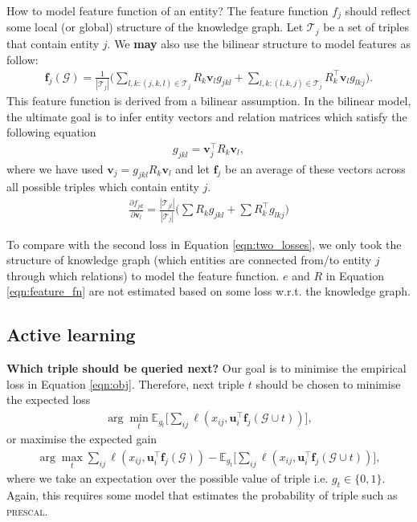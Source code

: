\documentclass{article} %
\theoremstyle{definition}
\newcommand\bs{\boldsymbol}
\begin{document}
How to model feature function of an entity? The feature function $f_j$ should reflect some local (or global) structure of the knowledge graph.  Let $\mathcal{T}_j$ be a set of triples that contain entity $j$. We \textbf{may} also use the bilinear structure to model features as follow:
\begin{align}
\label{eqn:feature_fn}
\bs{f}_j(\mathcal{G}) = \frac{1}{|\mathcal{T}_j|} \bigg( \sum_{l,k:(j,k,l) \in \mathcal{T}_j} R_k \bs{v}_{l} g_{jkl} + \sum_{l,k:(l,k,j) \in \mathcal{T}_j}R_k^\top \bs{v}_{l} g_{lkj} \bigg).
\end{align}
This feature function is derived from a bilinear assumption. In the bilinear model, the ultimate goal is to infer entity vectors and relation matrices which satisfy the following equation
\begin{align}
g_{jkl} = \bs{v}_j ^\top R_k \bs{v}_l,
\end{align}
where we have used $\bs{v}_j = g_{jkl} R_k \bs{v}_l$ and let $\bs{f}_j$ be an average of these vectors across all possible triples which contain entity $j$.
\begin{align}
\frac{\partial f_{jd}}{\partial\bs{v}_l} = \frac{|\mathcal{T}_{jl}|}{|\mathcal{T}_j|} \bigg( \sum R_k g_{jkl} + \sum R_k^\top g_{lkj} \bigg)
\end{align}

To compare with the second loss in Equation \ref{eqn:two_losses}, we only took the structure of knowledge graph (which entities are connected from/to entity $j$ through which relations) to model the feature function. $e$ and $R$ in Equation \ref{eqn:feature_fn} are not estimated based on some loss w.r.t. the knowledge graph.

\subsection{Active learning}
\textbf{Which triple should be queried next?} Our goal is to minimise the empirical loss in Equation \ref{eqn:obj}. Therefore, next triple $t$ should be chosen to minimise the expected loss
\begin{align}
\arg\min_t \mathbb{E}_{g_t}\bigg[\sum_{ij}\ell(x_{ij}, \bs{u}_{i}^\top  \bs{f}_j(\mathcal{G} \cup t))\bigg],
\end{align}
or maximise the expected gain
\begin{align}
\arg\max_t \sum_{ij}\ell(x_{ij}, \bs{u}_{i}^\top  \bs{f}_j(\mathcal{G})) - \mathbb{E}_{g_t}\bigg[\sum_{ij}\ell(x_{ij}, \bs{u}_{i}^\top  \bs{f}_j(\mathcal{G} \cup t))\bigg],
\end{align}
where we take an expectation over the possible value of triple i.e. $g_t \in \{0, 1\}$. Again, this requires some model that estimates the probability of triple such as \textsc{prescal}.
\end{document}
